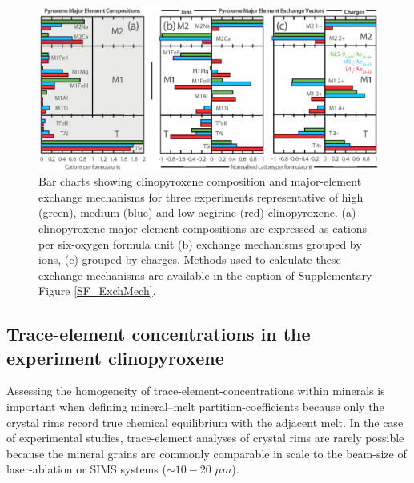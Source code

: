 \documentclass[review,authoryear,12pt]{elsarticle}
\begin{document}
 \begin{figure}[tb]
        \begin{center}
        \includegraphics[width=1\textwidth]{5_ExchangeMechBar_REVIEW-02.eps}
        \caption[Bar chart of clinopyroxene compositions and major-element exchange mechanisms]{Bar charts showing clinopyroxene composition and major-element exchange mechanisms for three experiments representative of high (green), medium (blue) and low-aegirine (red) clinopyroxene. (a) clinopyroxene major-element compositions are expressed as cations per six-oxygen formula unit (b) exchange mechanisms grouped by ions, (c) grouped by charges. Methods used to calculate these exchange mechanisms are available in the caption of Supplementary Figure \ref{SF_ExchMech}.}
        \label{ExchMechBar}
        \end{center}
        \end{figure}





\subsection{Trace-element concentrations in the experiment clinopyroxene}
Assessing the homogeneity of trace-element-concentrations within minerals is important when defining mineral--melt partition-coefficients because only the crystal rims record true chemical equilibrium with the adjacent melt. 
In the case of experimental studies, trace-element analyses of crystal rims are rarely possible because the mineral grains are commonly comparable in scale to the beam-size of laser-ablation or SIMS systems ($\sim 10-20$ $ \mu m$).



\end{document}
